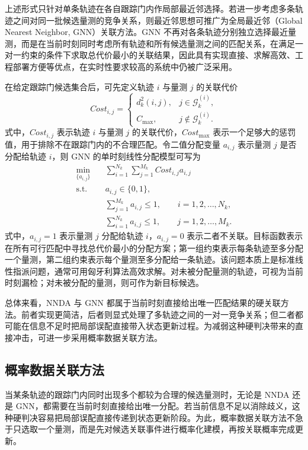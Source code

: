 \documentclass{xdupgthesis}
\begin{document}
上述形式只针对单条轨迹在各自跟踪门内作局部最近邻选择。若进一步考虑多条轨迹之间对同一批候选量测的竞争关系，则最近邻思想可推广为全局最近邻（Global Nearest Neighbor, GNN）关联方法。GNN 不再对各条轨迹分别独立选择最近量测，而是在当前时刻同时考虑所有轨迹和所有候选量测之间的匹配关系，在满足一对一约束的条件下求取总代价最小的关联结果，因此具有实现直接、求解高效、工程部署方便等优点，在实时性要求较高的系统中仍被广泛采用\cite{kuhn1955hungarian,wang2022improvedgnn}。

在给定跟踪门候选集合后，可先定义轨迹 $i$ 与量测 $j$ 的关联代价
\begin{equation}
	Cost_{i,j}
	=
	\begin{cases}
		d_k^2(i,j), & j\in\mathcal{G}^{(i)}_k,\\
		C_{\max}, & j\notin\mathcal{G}^{(i)}_k.
	\end{cases}
\end{equation}
式中，$Cost_{i,j}$ 表示轨迹 $i$ 与量测 $j$ 的关联代价，$Cost_{\max}$ 表示一个足够大的惩罚值，用于排除不在跟踪门内的不合理匹配。令二值分配变量 $a_{i,j}$ 表示量测 $j$ 是否分配给轨迹 $i$，则 GNN 的单时刻线性分配模型可写为
\begin{align}
	\min_{\{a_{i,j}\}}\quad
	& \sum_{i=1}^{N_k}\sum_{j=1}^{M_k} Cost_{i,j}a_{i,j} \\
	\text{s.t.}\quad
	& a_{i,j}\in\{0,1\}, \\
	& \sum_{j=1}^{M_k} a_{i,j}\le 1,\qquad i=1,2,\ldots,N_k, \\
	& \sum_{i=1}^{N_k} a_{i,j}\le 1,\qquad j=1,2,\ldots,M_k.
\end{align}
式中，$a_{i,j}=1$ 表示量测 $j$ 分配给轨迹 $i$，$a_{i,j}=0$ 表示二者不关联。目标函数表示在所有可行匹配中寻找总代价最小的分配方案；第一组约束表示每条轨迹至多分配一个量测，第二组约束表示每个量测至多分配给一条轨迹。该问题本质上是标准线性指派问题，通常可用匈牙利算法高效求解。对未被分配量测的轨迹，可视为当前时刻漏检；对未被分配的量测，则可作为新目标候选。

总体来看，NNDA 与 GNN 都属于当前时刻直接给出唯一匹配结果的硬关联方法。前者实现更简洁，后者则显式处理了多轨迹之间的一对一竞争关系；但二者都可能在信息不足时把局部误配直接带入状态更新过程。为减弱这种硬判决带来的直接冲击，可进一步采用概率数据关联方法。

\subsection{概率数据关联方法}

当某条轨迹的跟踪门内同时出现多个都较为合理的候选量测时，无论是 NNDA 还是 GNN，都需要在当前时刻直接给出唯一分配。若当前信息不足以消除歧义，这种硬判决容易把局部误配直接传递到状态更新阶段。为此，概率数据关联方法不急于只选取一个量测，而是先对候选关联事件进行概率化建模，再按关联概率完成更新。
\end{document}
